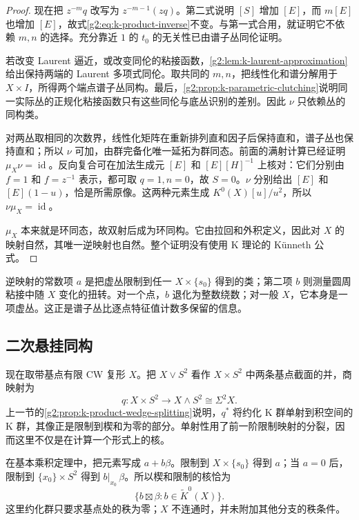 \begin{proof}
	现在把 \(z^{-m}q\) 改写为 \(z^{-m-1}(zq)\)。第二式说明 \([S]\) 增加 \([E]\)，而 \(m[E]\) 也增加 \([E]\)，故式\eqref{g2:eq:k-product-inverse}不变。与第一式合用，就证明它不依赖 \(m,n\) 的选择。充分靠近 \(1\) 的 \(t_0\) 的无关性已由谱子丛同伦证明。

	若改变 Laurent 逼近，或改变同伦的粘接函数，\cref{g2:lem:k-laurent-approximation}给出保持两端的 Laurent 多项式同伦。取共同的 \(m,n\)，把线性化和谱分解用于 \(X\times I\)，所得两个端点谱子丛同构。最后，\cref{g2:prop:k-parametric-clutching}说明同一实际丛的正规化粘接函数只有这些同伦与底丛识别的差别。因此 \(\nu\) 只依赖丛的同构类。

	对两丛取相同的次数界，线性化矩阵在重新排列直和因子后保持直和，谱子丛也保持直和；所以 \(\nu\) 可加，由群完备化唯一延拓为群同态。前面的满射计算已经证明 \(\mu_X\nu=\operatorname{id}\)。反向复合可在加法生成元 \([E]\) 和 \([E][H]^{-1}\) 上核对：它们分别由 \(f=1\) 和 \(f=z^{-1}\) 表示，都可取 \(q=1,n=0\)，故 \(S=0\)。\(\nu\) 分别给出 \([E]\) 和 \([E](1-u)\)，恰是所需原像。这两种元素生成 \(K^0(X)[u]/u^2\)，所以 \(\nu\mu_X=\operatorname{id}\)。

	\(\mu_X\) 本来就是环同态，故双射后成为环同构。它由拉回和外积定义，因此对 \(X\) 的映射自然，其唯一逆映射也自然。整个证明没有使用 K 理论的 Künneth 公式。
\end{proof}

逆映射的常数项 \(a\) 是把虚丛限制到任一 \(X\times\{s_0\}\) 得到的类；第二项 \(b\) 则测量圆周粘接中随 \(X\) 变化的扭转。对一个点，\(b\) 退化为整数绕数；对一般 \(X\)，它本身是一项虚丛。这正是谱子丛比逐点特征值计数多保留的信息。

\subsection{二次悬挂同构}
\label{g2:subsec:2403:07}
现在取带基点有限 CW 复形 \(X\)。把 \(X\vee S^2\) 看作 \(X\times S^2\) 中两条基点截面的并，商映射为
\[
	q:X\times S^2\longrightarrow X\wedge S^2\cong\Sigma^2X.
\]
上一节的\cref{g2:prop:k-product-wedge-splitting}说明，\(q^*\) 将约化 K 群单射到积空间的 K 群，其像正是限制到楔和为零的部分。单射性用了前一阶限制映射的分裂，因而这里不仅是在计算一个形式上的核。

在基本乘积定理中，把元素写成 \(a+b\beta\)。限制到 \(X\times\{s_0\}\) 得到 \(a\)；当 \(a=0\) 后，限制到 \(\{x_0\}\times S^2\) 得到 \(b|_{x_0}\,\beta\)。所以楔和限制的核恰为
\[
	\{b\boxtimes\beta:b\in\widetilde K^0(X)\}.
\]
这里约化群只要求基点处的秩为零；\(X\) 不连通时，并未附加其他分支的秩条件。

